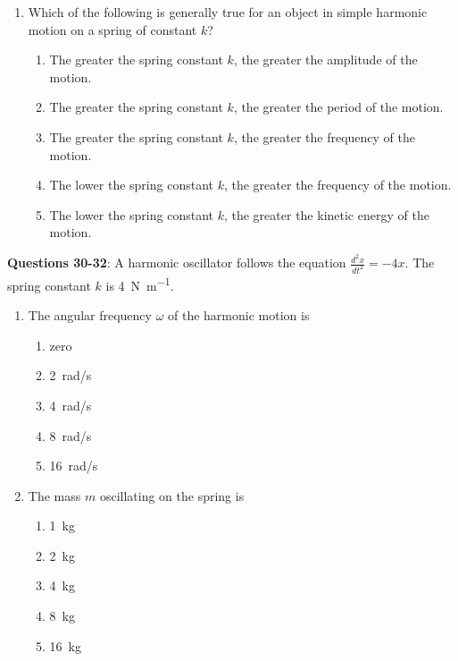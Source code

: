 \documentclass{../../oss-apphys}
\begin{document}
\begin{multicols}{2}
\begin{enumerate}[leftmargin=18pt]
  \item Which of the following is generally true for an object in simple
    harmonic motion on a spring of constant $k$?
    \begin{enumerate}[noitemsep,topsep=0pt,leftmargin=18pt,label=(\Alph*)]
    \item The greater the spring constant $k$, the greater the amplitude of the
      motion.
    \item The greater the spring constant $k$, the greater the period of the
      motion.
    \item The greater the spring constant $k$, the greater the frequency of the
      motion.
    \item The lower the spring constant $k$, the greater the frequency of the
      motion.
    \item The lower the spring constant $k$, the greater the kinetic energy of
      the motion.
    \end{enumerate}
  \end{enumerate}
  \columnbreak
  
  \textbf{Questions 30-32}: A harmonic oscillator follows the equation
  $\displaystyle\frac{d^2x}{dt^2}=-4x$. The spring constant $k$ is
  \SI{4}{\newton\per\metre}.
  \begin{enumerate}[leftmargin=18pt,resume]
  \item The angular frequency $\omega$ of the harmonic motion is
    \begin{enumerate}[noitemsep,topsep=0pt,leftmargin=18pt,label=(\Alph*)]
    \item zero
    \item\SI{2}{rad/s}
    \item\SI{4}{rad/s}
    \item\SI{8}{rad/s}
    \item\SI{16}{rad/s}
    \end{enumerate}

  \item The mass $m$ oscillating on the spring is
    \begin{enumerate}[noitemsep,topsep=0pt,leftmargin=18pt,label=(\Alph*)]
    \item\SI{1}{\kilo\gram}
    \item\SI{2}{\kilo\gram}
    \item\SI{4}{\kilo\gram}
    \item\SI{8}{\kilo\gram}
    \item\SI{16}{\kilo\gram}
    \end{enumerate}
    

\end{enumerate}
\end{multicols}
\end{document}
